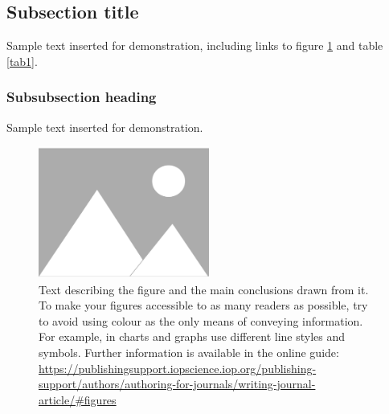 \documentclass{iopjournal}
\begin{document}



\subsection{Subsection title}
Sample text inserted for demonstration, including links to figure \ref{fig1} and table \ref{tab1}.

\subsubsection{Subsubsection heading}
Sample text inserted for demonstration.

\begin{figure}
 \centering
        \includegraphics[width=0.5\textwidth]{figure1}
 \caption{Text describing the figure and the main conclusions drawn from it. To make your figures accessible to as many readers as possible, try to avoid using colour as the only means of conveying information. For example, in charts and graphs use different line styles and symbols. Further information is available in the online guide: \href{https://publishingsupport.iopscience.iop.org/publishing-support/authors/authoring-for-journals/writing-journal-article/\#figures}{https://publishingsupport.iopscience.iop.org/publishing-support/authors/authoring-for-journals/writing-journal-article/\#figures}}
\label{fig1}
\end{figure}
\end{document}
